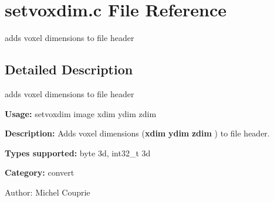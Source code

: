 \section{setvoxdim.c File Reference}
\label{setvoxdim_8c}
adds voxel dimensions to file header 



\subsection{Detailed Description}
adds voxel dimensions to file header 

{\bf Usage:} setvoxdim image xdim ydim zdim

{\bf Description:} Adds voxel dimensions ({\bf xdim} {\bf ydim} {\bf zdim} ) to file header.

{\bf Types supported:} byte 3d, int32\_\-t 3d

{\bf Category:} convert

\begin{Desc}
\item[Author:]Michel Couprie \end{Desc}
